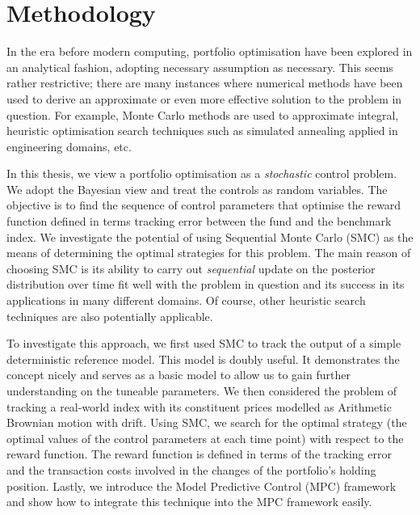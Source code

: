 \section{Methodology}
In the era before modern computing, portfolio optimisation have been explored in an analytical fashion, adopting necessary assumption as necessary. This seems rather restrictive; there are many instances where numerical methods have been used to derive an approximate or even more effective solution to the problem in question. For example, Monte Carlo methods are used to approximate integral, heuristic optimisation search techniques such as simulated annealing applied in engineering domains, etc.

In this thesis, we view a portfolio optimisation as a \emph{stochastic} control problem. We adopt the Bayesian view and treat the controls as random variables. The objective is to find the sequence of control parameters that optimise the reward function defined in terms tracking error between the fund and the benchmark index. We investigate the potential of using Sequential Monte Carlo (SMC) as the means of determining the optimal strategies for this problem. The main reason of choosing SMC is its ability to carry out \emph{sequential} update on the posterior distribution over time fit well with the problem in question and its success in its applications in many different domains. Of course, other heuristic search techniques are also potentially applicable.

To investigate this approach, we first used SMC to track the output of a simple deterministic reference model. This model is doubly useful. It demonstrates the concept nicely and serves as a basic model to allow us to gain further understanding on the tuneable parameters. We then considered the problem of tracking a real-world index with its constituent prices modelled as Arithmetic Brownian motion with drift. Using SMC, we search for the optimal strategy (the optimal values of the control parameters at each time point) with respect to the reward function. The reward function is defined in terms of the tracking error and the transaction costs involved in the changes of the portfolio's holding position. Lastly, we introduce the Model Predictive Control (MPC) framework and show how to integrate this technique into the MPC framework easily.

